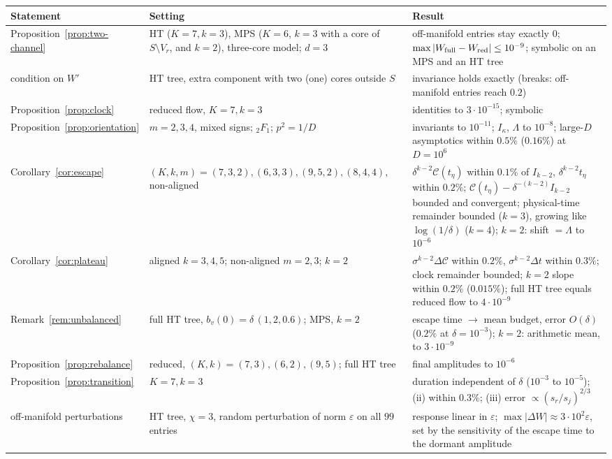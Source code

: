 \documentclass[11pt]{article}
\newcommand{\Clk}{\mathcal{C}}
\theoremstyle{definition}
\numberwithin{equation}{section}
\begin{document}
\begin{table}[tbp]
\centering
\footnotesize
\renewcommand{\arraystretch}{1.2}
\begin{tabular}{L{0.21\textwidth}L{0.33\textwidth}L{0.38\textwidth}}
\toprule
Statement & Setting & Result \\
\midrule
Proposition~\ref{prop:two-channel} & HT ($K=7,k=3$), MPS ($K=6$, $k=3$ with a core of $S\setminus V_r$, and $k=2$), three-core model; $d=3$ & off-manifold entries stay exactly $0$; $\max|W_{\rm full}-W_{\rm red}|\le10^{-9}$; symbolic on an MPS and an HT tree \\
condition on $W'$ & HT tree, extra component with two (one) cores outside $S$ & invariance holds exactly (breaks: off-manifold entries reach $0.2$) \\
Proposition~\ref{prop:clock} & reduced flow, $K=7,k=3$ & identities to $3\cdot10^{-15}$; symbolic \\
Proposition~\ref{prop:orientation} & $m=2,3,4$, mixed signs; ${}_2F_1$; $p^2=1/D$ & invariants to $10^{-11}$; $I_\kappa$, $\Lambda$ to $10^{-8}$; large-$D$ asymptotics within $0.5\%$ ($0.16\%$) at $D=10^6$ \\
Corollary~\ref{cor:escape} & $(K,k,m)=(7,3,2),(6,3,3),(9,5,2),(8,4,4)$, non-aligned & $\delta^{k-2}\Clk(t_\eta)$ within $0.1\%$ of $I_{k-2}$, $\delta^{k-2}t_\eta$ within $0.2\%$; $\Clk(t_\eta)-\delta^{-(k-2)}I_{k-2}$ bounded and convergent; physical-time remainder bounded ($k=3$), growing like $\log(1/\delta)$ ($k=4$); $k=2$: shift $=\Lambda$ to $10^{-6}$ \\
Corollary~\ref{cor:plateau} & aligned $k=3,4,5$; non-aligned $m=2,3$; $k=2$ & $\sigma^{k-2}\Delta\Clk$ within $0.2\%$, $\sigma^{k-2}\Delta t$ within $0.3\%$; clock remainder bounded; $k=2$ slope within $0.2\%$ ($0.015\%$); full HT tree equals reduced flow to $4\cdot10^{-9}$ \\
Remark~\ref{rem:unbalanced} & full HT tree, $b_v(0)=\delta\,(1,2,0.6)$; MPS, $k=2$ & escape time $\to$ mean budget, error $O(\delta)$ ($0.2\%$ at $\delta=10^{-3}$); $k=2$: arithmetic mean, to $3\cdot10^{-9}$ \\
Proposition~\ref{prop:rebalance} & reduced, $(K,k)=(7,3),(6,2),(9,5)$; full HT tree & final amplitudes to $10^{-6}$ \\
Proposition~\ref{prop:transition} & $K=7,k=3$ & duration independent of $\delta$ ($10^{-3}$ to $10^{-5}$); (ii) within $0.3\%$; (iii) error $\propto(s_r/s_j)^{2/3}$ \\
off-manifold perturbations & HT tree, $\chi=3$, random perturbation of norm $\varepsilon$ on all $99$ entries & response linear in $\varepsilon$; $\max|\Delta W|\approx3\cdot10^2\varepsilon$, set by the sensitivity of the escape time to the dormant amplitude \\

\end{tabular}
\end{table}
\end{document}
